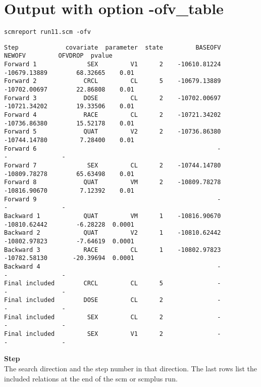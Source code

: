 \documentclass[hideglossary,notoc,hidelof,hidelot,hideTheSignaturePage,hideLinkCurrent,hideloa,pdfLatex,noClient,notitle,hideConfidential]{PMXstyle-20170118kajsa4}
\begin{document}
\section{Output with option -ofv\_table}
\begin{verbatim}
scmreport run11.scm -ofv
\end{verbatim}
{\tiny
\begin{verbatim}
Step             covariate  parameter  state         BASEOFV          NEWOFV         OFVDROP  pvalue
Forward 1              SEX         V1      2    -10610.81224    -10679.13889        68.32665    0.01
Forward 2             CRCL         CL      5    -10679.13889    -10702.00697        22.86808    0.01
Forward 3             DOSE         CL      2    -10702.00697    -10721.34202        19.33506    0.01
Forward 4             RACE         CL      2    -10721.34202    -10736.86380        15.52178    0.01
Forward 5             QUAT         V2      2    -10736.86380    -10744.14780         7.28400    0.01
Forward 6                                                  -               -               -        
Forward 7              SEX         CL      2    -10744.14780    -10809.78278        65.63498    0.01
Forward 8             QUAT         VM      2    -10809.78278    -10816.90670         7.12392    0.01
Forward 9                                                  -               -               -        
Backward 1            QUAT         VM      1    -10816.90670    -10810.62442        -6.28228  0.0001
Backward 2            QUAT         V2      1    -10810.62442    -10802.97823        -7.64619  0.0001
Backward 3            RACE         CL      1    -10802.97823    -10782.58130       -20.39694  0.0001
Backward 4                                                 -               -               -        
Final included        CRCL         CL      5               -               -               -        
Final included        DOSE         CL      2               -               -               -        
Final included         SEX         CL      2               -               -               -        
Final included         SEX         V1      2               -               -               -        
\end{verbatim}
}



{\bfseries Step}\\
The search direction and the step number in that direction. The last rows list the included relations
at the end of the scm or scmplus run.
\end{document}
